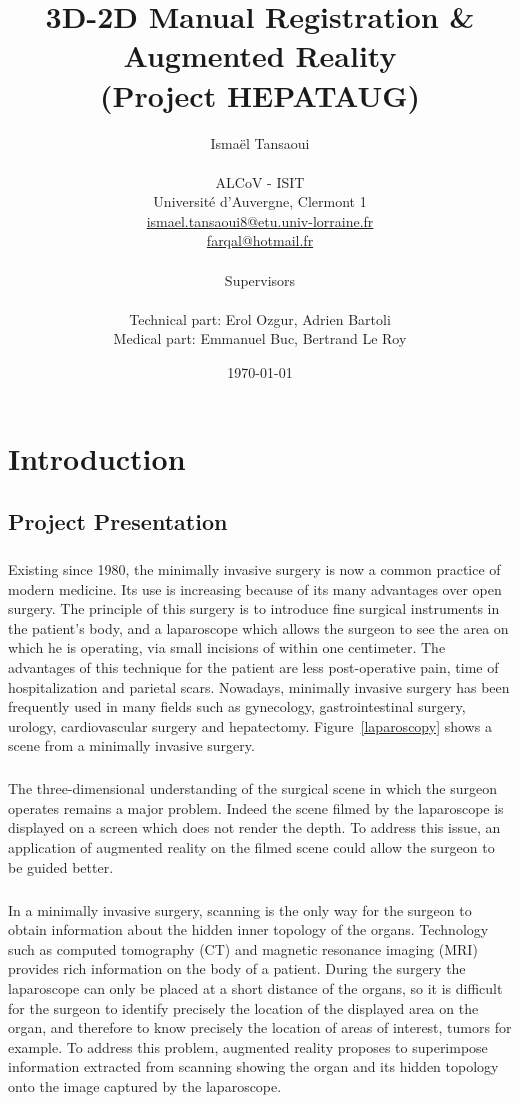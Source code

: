 \documentclass[12pt]{report}
\title{3D-2D Manual Registration \& Augmented Reality\\ (Project HEPATAUG)}
\author{Ismaël Tansaoui\\ \\ ALCoV - ISIT\\ Université d'Auvergne, Clermont 1\\
  \url{ismael.tansaoui8@etu.univ-lorraine.fr}\\
  \url{farqal@hotmail.fr}\\ \\
Supervisors\\  \\ Technical part: Erol Ozgur, Adrien Bartoli\\ Medical part: Emmanuel Buc, Bertrand Le Roy }
\date{\today}
\begin{document}
\maketitle


\tableofcontents


\chapter{Introduction} \label{sec:introduction}

\section{Project Presentation}  \label{sec:project presentation} 
\paragraph{}
	Existing since 1980, the minimally invasive surgery is now a common practice of modern medicine. Its use is increasing because of its many advantages over open surgery. The principle of this surgery is to introduce fine surgical instruments in the patient's body, and a laparoscope which allows the surgeon to see the area on which he is operating, via small incisions of within one centimeter. The advantages of this technique for the patient are less post-operative pain, time of hospitalization and parietal scars. Nowadays, minimally invasive surgery has been frequently used in many fields such as gynecology, gastrointestinal surgery, urology, cardiovascular surgery and hepatectomy. Figure~\ref{laparoscopy} shows a scene from a minimally invasive surgery.

\paragraph{}
	The three-dimensional understanding of the surgical scene in which the surgeon operates remains a major problem. Indeed the scene filmed by the laparoscope is displayed on a screen which does not render the depth. To address this issue, an application of augmented reality on the filmed scene could allow the surgeon to be guided better.

\paragraph{}
	In a minimally invasive surgery, scanning is the only way for the surgeon to obtain information about the hidden inner topology of the organs. Technology such as computed tomography (CT) and magnetic resonance imaging (MRI) provides rich information on the body of a patient. During the surgery the laparoscope can only be placed at a short distance of the organs, so it is difficult for the surgeon to identify precisely the location of the displayed area on the organ, and therefore to know precisely the location of areas of interest, tumors for example. To address this problem, augmented reality proposes to superimpose information extracted from scanning showing the organ and its hidden topology onto the image captured by the laparoscope.
\end{document}

